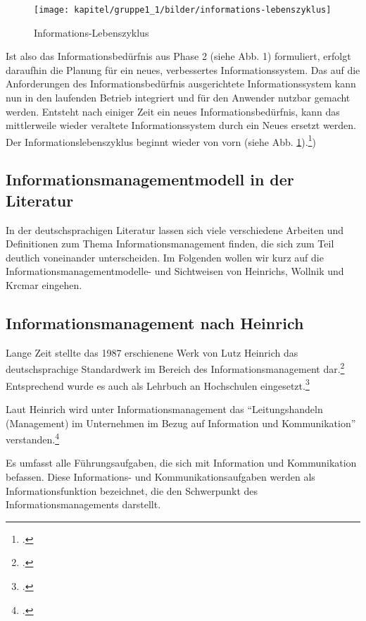 \begin{figure}[h!]
	\centering
	\texttt{[image: kapitel/gruppe1\_1/bilder/informations-lebenszyklus]}
	\caption{Informations-Lebenszyklus}
	\label{fig_informations_lebenszyklus}
\end{figure}

Ist also das Informationsbedürfnis aus Phase 2 (siehe Abb. 1) formuliert, erfolgt daraufhin die Planung für ein neues, verbessertes Informationssystem. Das auf die Anforderungen des Informationsbedürfnis ausgerichtete Informationssystem kann nun in den laufenden Betrieb integriert und für den Anwender nutzbar gemacht werden. Entsteht nach einiger Zeit ein neues Informationsbedürfnis, kann das mittlerweile wieder veraltete Informationssystem durch ein Neues ersetzt werden. Der Informationslebenszyklus beginnt wieder von vorn (siehe Abb. \ref{fig_informations_lebenszyklus}).\footcite{dippold_datenmanagement_2005})

\subsection{Informationsmanagementmodell in der Literatur}
In der deutschsprachigen Literatur lassen sich viele verschiedene Arbeiten und Definitionen zum Thema Informationsmanagement finden, die sich zum Teil deutlich voneinander unterscheiden. Im Folgenden wollen wir kurz auf die Informationsmanagementmodelle- und Sichtweisen von Heinrichs, Wollnik und Krcmar eingehen.

\subsection{Informationsmanagement nach Heinrich}

Lange Zeit stellte das 1987 erschienene Werk von Lutz Heinrich das deutschsprachige Standardwerk im Bereich des Informationsmanagement dar.\footcite{heinrich_informationsmanagement_2005} Entsprechend wurde es auch als Lehrbuch an Hochschulen eingesetzt.\footcite[Vgl.][]{heinrich_inm_2002}

Laut Heinrich wird unter Informationsmanagement das “Leitungshandeln (Management) im Unternehmen im Bezug auf Information und Kommunikation” verstanden.\footcite{heinrich_informationsmanagement_2005}

Es umfasst alle Führungsaufgaben, die sich mit Information und Kommunikation befassen. Diese Informations- und Kommunikationsaufgaben werden als Informationsfunktion bezeichnet, die den Schwerpunkt des Informationsmanagements darstellt. 

